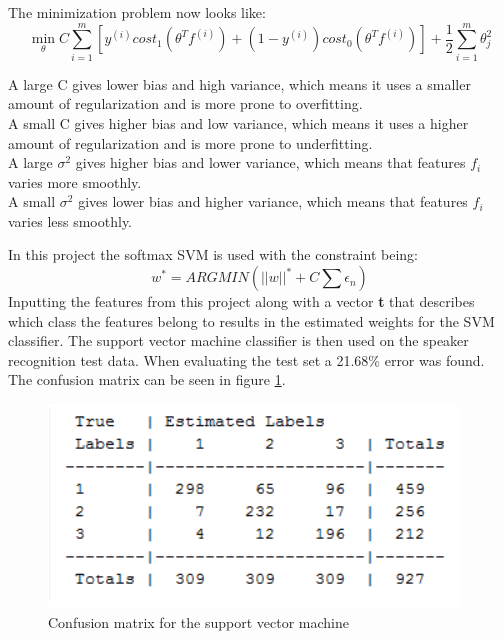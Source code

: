 The minimization problem now looks like:
\begin{equation}
\min_{\theta}C \sum_{i=1}^{m}
\left[ y^{(i)}cost_1(\theta^Tf^{(i)})+(1-y^{(i)})cost_0(\theta^Tf^{(i)}) \right]
+ \frac{1}{2}\sum_{i=1}^{m}\theta^2_j
\end{equation}

A large C gives lower bias and high variance, which means it uses a smaller amount of regularization and is more prone to overfitting. \\
A small C gives higher bias and low variance, which means it uses a higher amount of regularization and is more prone to underfitting. \\
A large $\sigma^2$ gives higher bias and lower variance, which means that features $f_i$ varies more smoothly. \\
A small $\sigma^2$ gives lower bias and higher variance, which means that features $f_i$ varies less smoothly.

In this project the softmax SVM is used with the constraint being:
\begin{equation}
w^* = ARG MIN (||w||^* + C \sum \epsilon_n)
\end{equation}
Inputting the features from this project along with a vector \textbf{t} that describes which class the features belong to results in the estimated weights for the SVM classifier. The support vector machine classifier is then used on the speaker recognition test data. When evaluating the test set a 21.68\% error was found. The confusion matrix can be seen in figure \ref{fig:conmatsvm}. 

\begin{figure}[H]
\centering
\includegraphics[scale=.75]{billeder/conmatsvm}
\caption{Confusion matrix for the support vector machine }
\label{fig:conmatsvm}
\end{figure}


